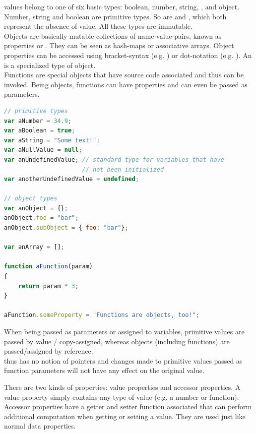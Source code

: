  values belong to one of six basic types: boolean, number, string, ,  and object.\\
Number, string and boolean are primitive types. So are  and , which both represent the absence of value. All these types are immutable.\\
Objects are basically mutable collections of name-value-pairs, known as properties or . They can be seen as hash-maps or associative arrays. Object properties can be accessed using bracket-syntax (e.g. ) or dot-notation (e.g. ). An  is a specialized type of  object.\\
Functions are special objects that have source code associated and thus can be invoked. Being objects, functions can have properties and can even be passed as parameters.

\SingleSpacing
\begin{lstlisting}[language=JavaScript, caption=Types in \myProperName{JavaScript}]
// primitive types
var aNumber = 34.9;
var aBoolean = true;
var aString = "Some text!";
var aNullValue = null;
var anUndefinedValue; // standard type for variables that have 
                      // not been initialized
var anotherUndefinedValue = undefined;

// object types
var anObject = {};
anObject.foo = "bar";
anObject.subObject = { foo: "bar"};

var anArray = [];

function aFunction(param)
{
	return param * 3;
}

aFunction.someProperty = "Functions are objects, too!";
\end{lstlisting}
\OnehalfSpacing

When being passed as parameters or assigned to variables, primitive values are passed by value / copy-assigned, whereas objects (including functions) are passed/assigned by reference.\\
 thus has no notion of pointers and changes made to primitive values passed as function parameters will not have any effect on the original value.

There are two kinds of properties: value properties and accessor properties. A value property simply contains any type of value (e.g. a number or function). Accessor properties have a getter and setter function associated that can perform additional computation when getting or setting a value. They are used just like normal data properties.

